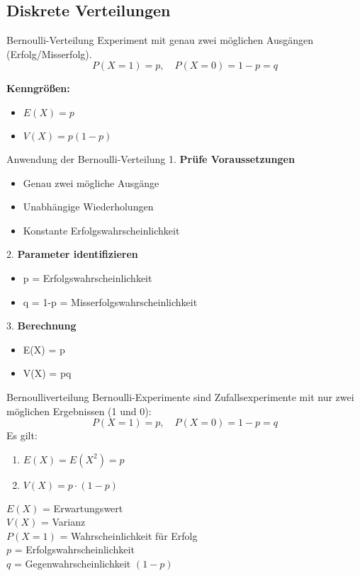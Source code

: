 \subsection{Diskrete Verteilungen}

\begin{definition}{Bernoulli-Verteilung}
Experiment mit genau zwei möglichen Ausgängen (Erfolg/Misserfolg).
$$P(X=1) = p, \quad P(X=0) = 1-p = q$$

\textbf{Kenngrößen:}
\begin{itemize}
    \item $E(X) = p$
    \item $V(X) = p(1-p)$
\end{itemize}
\end{definition}

\begin{KR}{Anwendung der Bernoulli-Verteilung}
1. \textbf{Prüfe Voraussetzungen}
   \begin{itemize}
   \item Genau zwei mögliche Ausgänge
   \item Unabhängige Wiederholungen
   \item Konstante Erfolgswahrscheinlichkeit
   \end{itemize}

2. \textbf{Parameter identifizieren}
   \begin{itemize}
   \item p = Erfolgswahrscheinlichkeit
   \item q = 1-p = Misserfolgswahrscheinlichkeit
   \end{itemize}

3. \textbf{Berechnung}
   \begin{itemize}
   \item E(X) = p
   \item V(X) = pq
   \end{itemize}
\end{KR}

\begin{definition}{Bernoulliverteilung}
Bernoulli-Experimente sind Zufallsexperimente mit nur zwei möglichen Ergebnissen (1 und 0):
$$
P(X=1)=p, \quad P(X=0)=1-p=q
$$
Es gilt:
\begin{enumerate}
	\item $E(X)=E(X^2)=p$
	\item $V(X)=p \cdot(1-p)$
\end{enumerate}
\hfill \break
$E(X)$ = Erwartungswert\\
$V(X)$ = Varianz\\
$P(X=1)$ = Wahrscheinlichkeit für Erfolg\\
$p$ = Erfolgswahrscheinlichkeit\\
$q$ = Gegenwahrscheinlichkeit $(1-p)$\\
\end{definition}

